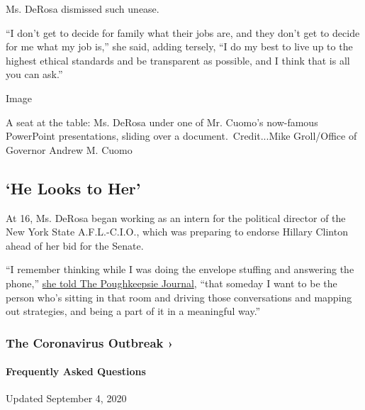 Ms. DeRosa dismissed such unease.

``I don't get to decide for family what their jobs are, and they don't
get to decide for me what my job is,'' she said, adding tersely, ``I do
my best to live up to the highest ethical standards and be transparent
as possible, and I think that is all you can ask.''

Image

A seat at the table: Ms. DeRosa under one of Mr. Cuomo's now-famous
PowerPoint presentations, sliding over a document.~Credit...Mike
Groll/Office of Governor Andrew M. Cuomo

\hypertarget{he-looks-to-her}{%
\subsection{`He Looks to Her'}\label{he-looks-to-her}}

At 16, Ms. DeRosa began working as an intern for the political director
of the New York State A.F.L.-C.I.O., which was preparing to endorse
Hillary Clinton ahead of her bid for the Senate.

``I remember thinking while I was doing the envelope stuffing and
answering the phone,''
\href{https://www.poughkeepsiejournal.com/story/news/local/new-york/2019/06/03/cuomos-right-hand-melissa-derosa-unapologetically-fierce/1302725001/}{she
told The Poughkeepsie Journal}, ``that someday I want to be the person
who's sitting in that room and driving those conversations and mapping
out strategies, and being a part of it in a meaningful way.''

\href{https://www.nytimes3xbfgragh.onion/news-event/coronavirus?action=click\&pgtype=Article\&state=default\&region=MAIN_CONTENT_3\&context=storylines_faq}{}

\hypertarget{the-coronavirus-outbreak-}{%
\subsubsection{The Coronavirus Outbreak
›}\label{the-coronavirus-outbreak-}}

\hypertarget{frequently-asked-questions}{%
\paragraph{Frequently Asked
Questions}\label{frequently-asked-questions}}

Updated September 4, 2020

